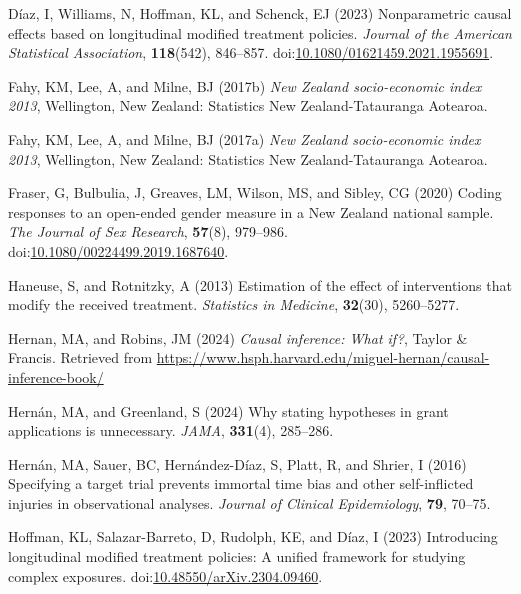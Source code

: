 \documentclass[
  single column]{article}
\newlength{\cslhangindent}
\newenvironment{CSLReferences}[2] %
 {\begin{list}{}{%
  \setlength{\itemindent}{0pt}
  \setlength{\leftmargin}{0pt}
  \setlength{\parsep}{0pt}
  \ifodd #1
   \setlength{\leftmargin}{\cslhangindent}
   \setlength{\itemindent}{-1\cslhangindent}
  \fi
  \setlength{\itemsep}{#2\baselineskip}}}
 {\end{list}}
\begin{document}
\begin{CSLReferences}{1}{0}
Díaz, I, Williams, N, Hoffman, KL, and Schenck, EJ (2023) Nonparametric
causal effects based on longitudinal modified treatment policies.
\emph{Journal of the American Statistical Association},
\textbf{118}(542), 846--857.
doi:\href{https://doi.org/10.1080/01621459.2021.1955691}{10.1080/01621459.2021.1955691}.

Fahy, KM, Lee, A, and Milne, BJ (2017b) \emph{{N}ew {Z}ealand
socio-economic index 2013}, Wellington, New Zealand: Statistics New
Zealand-Tatauranga Aotearoa.

Fahy, KM, Lee, A, and Milne, BJ (2017a) \emph{{N}ew {Z}ealand
socio-economic index 2013}, Wellington, New Zealand: Statistics New
Zealand-Tatauranga Aotearoa.

Fraser, G, Bulbulia, J, Greaves, LM, Wilson, MS, and Sibley, CG (2020)
Coding responses to an open-ended gender measure in a {N}ew {Z}ealand
national sample. \emph{The Journal of Sex Research}, \textbf{57}(8),
979--986.
doi:\href{https://doi.org/10.1080/00224499.2019.1687640}{10.1080/00224499.2019.1687640}.

Haneuse, S, and Rotnitzky, A (2013) Estimation of the effect of
interventions that modify the received treatment. \emph{Statistics in
Medicine}, \textbf{32}(30), 5260--5277.

Hernan, MA, and Robins, JM (2024) \emph{Causal inference: What if?},
Taylor \& Francis. Retrieved from
\url{https://www.hsph.harvard.edu/miguel-hernan/causal-inference-book/}

Hernán, MA, and Greenland, S (2024) Why stating hypotheses in grant
applications is unnecessary. \emph{JAMA}, \textbf{331}(4), 285--286.

Hernán, MA, Sauer, BC, Hernández-Díaz, S, Platt, R, and Shrier, I (2016)
Specifying a target trial prevents immortal time bias and other
self-inflicted injuries in observational analyses. \emph{Journal of
Clinical Epidemiology}, \textbf{79}, 70--75.

Hoffman, KL, Salazar-Barreto, D, Rudolph, KE, and Díaz, I (2023)
Introducing longitudinal modified treatment policies: A unified
framework for studying complex exposures.
doi:\href{https://doi.org/10.48550/arXiv.2304.09460}{10.48550/arXiv.2304.09460}.


\end{CSLReferences}
\end{document}
